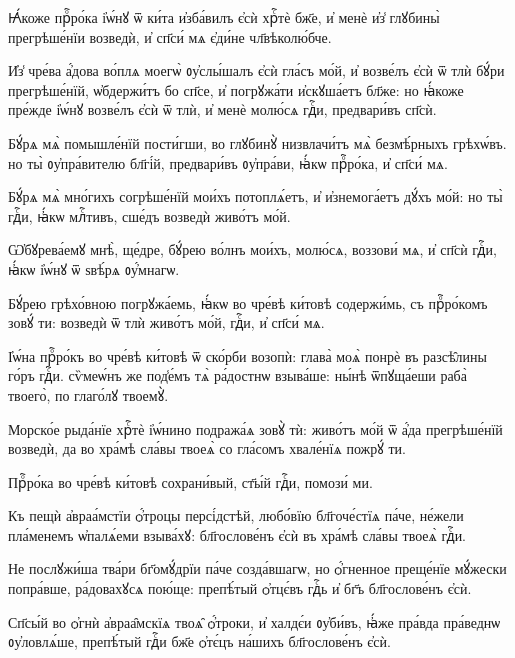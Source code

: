 \hKv Ꙗ҆́коже прⷪ҇ро́ка і҆ѡ́нꙋ ѿ ки́та и҆зба́вилъ є҆сѝ  хрⷭ҇тѐ бж҃е, и҆ менѐ и҆з̾ глꙋбины̀ прегрѣше́нїи  возведѝ, и҆ сп҃си́ мѧ є҆ди́не чл҃вѣколю́бче. 

\hKv И҆з̾ чре́ва а҆́дова во́плѧ моегѡ̀ ᲂу҆слы́шалъ є҆сѝ  гла́съ мо́й, и҆ возве́лъ є҆сѝ ѿ тлѝ бꙋ́ри  прегрѣше́нїй, ѡ҆бдержи́тъ бо сп҃се, и҆ погрꙋжа́ти  и҆скꙋша́етъ бл҃же: но ꙗ҆́коже пре́жде і҆ѡ́нꙋ возве́лъ  є҆сѝ ѿ тлѝ, и҆ менѐ молю́сѧ гдⷭ҇и, предвари́въ сп҃сѝ. 

\hKv Бꙋ́рѧ мѧ̀ помышле́нїй пости́гши, во глꙋбинꙋ̀ низвлачи́тъ мѧ̀  безмѣ́рныхъ грѣхѡ́въ. но ты̀ ᲂу҆пра́вителю бл҃гі́й,  предвари́въ ᲂу҆пра́ви, ꙗ҆́кѡ прⷪ҇ро́ка, и҆ сп҃си́ мѧ. 

\hKv Бꙋ́рѧ мѧ̀ мно́гихъ согрѣше́нїй мои́хъ потоплѧ́етъ, и҆  и҆знемога́етъ дꙋ́хъ мо́й: но ты̀ гдⷭ҇и, ꙗ҆́кѡ млⷭ҇тивъ,  сше́дъ возведѝ живо́тъ мо́й.  

\hKv Ѡ҆бꙋрева́емꙋ мнѣ̀, ще́дре, бꙋ́рею во́лнъ мои́хъ, молю́сѧ,  воззови́ мѧ, и҆ сп҃сѝ гдⷭ҇и, ꙗ҆́кѡ і҆ѡ́нꙋ ѿ ѕвѣ́рѧ  ᲂу҆́мнагѡ. 

\hKv Бꙋ́рею грѣхо́вною погрꙋжа́емь, ꙗ҆́кѡ во чре́вѣ ки́товѣ  содержи́мь, съ прⷪ҇ро́комъ зовꙋ́ ти: возведѝ ѿ тлѝ  живо́тъ мо́й, гдⷭ҇и, и҆ сп҃си́ мѧ. 

\hKv І҆ѡ́на прⷪ҇ро́къ во чре́вѣ ки́товѣ ѿ ско́рби возопѝ:  глава̀ моѧ̀ понрѐ въ разсѣ̑лины го́ръ гдⷭ҇и. сѷмеѡ́нъ же  под̾е́мъ тѧ̀ ра́достнѡ взыва́ше: ны́нѣ ѿпꙋща́еши раба̀  твоего̀, по глаго́лꙋ твоемꙋ̀. 

\hKv Морско́е рыда́нїе хрⷭ҇тѐ і҆ѡ́нино подража́ѧ зовꙋ̀ тѝ:  живо́тъ мо́й ѿ а҆́да прегрѣше́нїй возведѝ, да во хра́мѣ  сла́вы твоеѧ̀ со гла́сомъ хвале́нїѧ пожрꙋ́ ти. 

\hKv Прⷪ҇ро́ка во чре́вѣ ки́товѣ сохрани́вый, ст҃ы́й гдⷭ҇и,  помози́ ми.  
%

\hKv Къ пещѝ а҆враа́мстїи ѻ҆́троцы персі́дстѣй, любо́вїю  бл҃гоче́стїѧ па́че, не́жели пла́менемъ ѡ҆палѧ́еми взыва́хꙋ:  бл҃гослове́нъ є҆сѝ въ хра́мѣ сла́вы твоеѧ̀ гдⷭ҇и. 
%

\hKv Не послꙋжи́ша тва́ри бг҃омꙋ́дрїи па́че  созда́вшагѡ, но ѻ҆́гненное преще́нїе мꙋ́жески попра́вше,  ра́довахꙋсѧ пою́ще: препѣ́тый ѻ҆тцє́въ гдⷭ҇ь и҆ бг҃ъ  бл҃гослове́нъ є҆сѝ. 
%

\hKv Сп҃сы́й во ѻ҆гнѝ а҆враа̑мскїѧ твоѧ̑  ѻ҆́троки, и҆ халдє́и ᲂу҆би́въ, ꙗ҆́же пра́вда пра́веднѡ  ᲂу҆ловлѧ́ше, препѣ́тый гдⷭ҇и бж҃е ѻ҆тє́цъ на́шихъ  бл҃гослове́нъ є҆сѝ. 
%

